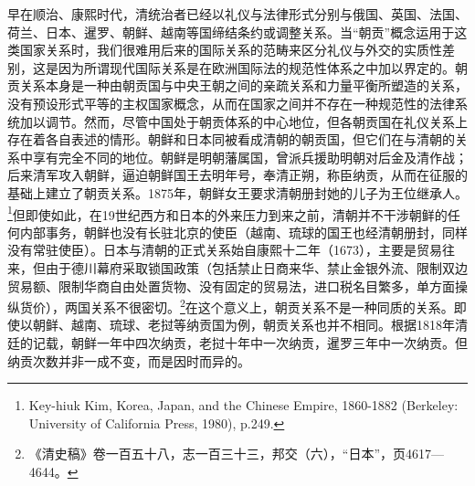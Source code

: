 \documentclass[a4paper, 12pt, openright]{ctexbook}
\begin{document}
早在顺治、康熙时代，清统治者已经以礼仪与法律形式分别与俄国、英国、法国、荷兰、日本、暹罗、朝鲜、越南等国缔结条约或调整关系。当“朝贡”概念运用于这类国家关系时，我们很难用后来的国际关系的范畴来区分礼仪与外交的实质性差别，这是因为所谓现代国际关系是在欧洲国际法的规范性体系之中加以界定的。朝贡关系本身是一种由朝贡国与中央王朝之间的亲疏关系和力量平衡所塑造的关系，没有预设形式平等的主权国家概念，从而在国家之间并不存在一种规范性的法律系统加以调节。然而，尽管中国处于朝贡体系的中心地位，但各朝贡国在礼仪关系上存在着各自表述的情形。朝鲜和日本同被看成清朝的朝贡国，但它们在与清朝的关系中享有完全不同的地位。朝鲜是明朝藩属国，曾派兵援助明朝对后金及清作战；后来清军攻入朝鲜，逼迫朝鲜国王去明年号，奉清正朔，称臣纳贡，从而在征服的基础上建立了朝贡关系。1875年，朝鲜女王要求清朝册封她的儿子为王位继承人。\footnote{Key-hiuk Kim, Korea, Japan, and the Chinese Empire, 1860-1882 (Berkeley: University of California Press, 1980), p.249.}但即使如此，在19世纪西方和日本的外来压力到来之前，清朝并不干涉朝鲜的任何内部事务，朝鲜也没有长驻北京的使臣（越南、琉球的国王也经清朝册封，同样没有常驻使臣）。日本与清朝的正式关系始自康熙十二年（1673），主要是贸易往来，但由于德川幕府采取锁国政策（包括禁止日商来华、禁止金银外流、限制双边贸易额、限制华商自由处置货物、没有固定的贸易法，进口税名目繁多，单方面操纵货价），两国关系不很密切。\footnote{《清史稿》卷一百五十八，志一百三十三，邦交（六），“日本”，页4617—4644。}在这个意义上，朝贡关系不是一种同质的关系。即使以朝鲜、越南、琉球、老挝等纳贡国为例，朝贡关系也并不相同。根据1818年清廷的记载，朝鲜一年中四次纳贡，老挝十年中一次纳贡，暹罗三年中一次纳贡。但纳贡次数并非一成不变，而是因时而异的。
\end{document}
